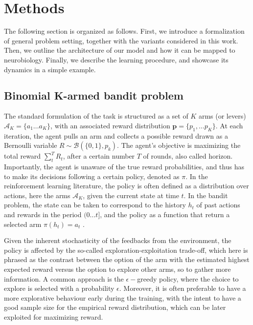 

\section{Methods}

\noindent The following section is organized as follows. First, we introduce a formalization of general problem setting, together with the variants considered in this work. Then, we outline the architecture of our model and how it can be mapped to neurobiology. Finally, we describe the learning procedure,
and showcase its dynamics in a simple example.


\subsection{Binomial K-armed bandit problem}
\hfill \break
\noindent The standard formulation of the task is structured as a set of $K$ arms (or levers) $\mathcal{A}_{K}=\{a_{1}\ldots a_{K}\}$, with an associated reward distribution $\mathbf{p}=\{p_{1}, \ldots p_{K}\}$.
At each iteration, the agent pulls an arm and collects a possible reward drawn as a Bernoulli variable $R\sim \mathcal{B}(\{0,1\},p_{k})$. The agent's objective is maximizing the total reward $\sum^{T}_{t} R_{t}$, after a certain number $T$ of rounds, also called horizon.
Importantly, the agent is unaware of the true reward probabilities, and thus has to make its decisions following a certain policy, denoted as $\pi$.
In the reinforcement learning literature, the policy is often defined as a distribution over actions, here the arms $\mathcal{A}_{K}$, given the current state at time $t$. In the bandit problem, the state can be taken to correspond to the history $h_{t}$ of past actions and rewards in the period
$(0\ldots t]$, and the policy as a function that return a selected arm $\pi(h_{t})=a_{t}$ \cite{qiForcedExplorationBandit2023}.

Given the inherent stochasticity of the feedbacks from the environment, the policy is affected by the so-called exploration-exploitation trade-off, which here is phrased as the contrast between the option of the arm with the estimated highest expected reward versus the option to explore other arms, so to gather more information.
A common approach is the $\epsilon-$greedy policy, where the choice to explore is selected with a probability $\epsilon$.
Moreover, it is often preferable to have a more explorative behaviour early during the training, with the intent to have a good sample size for the empirical reward distribution, which can be later exploited for maximizing reward.

